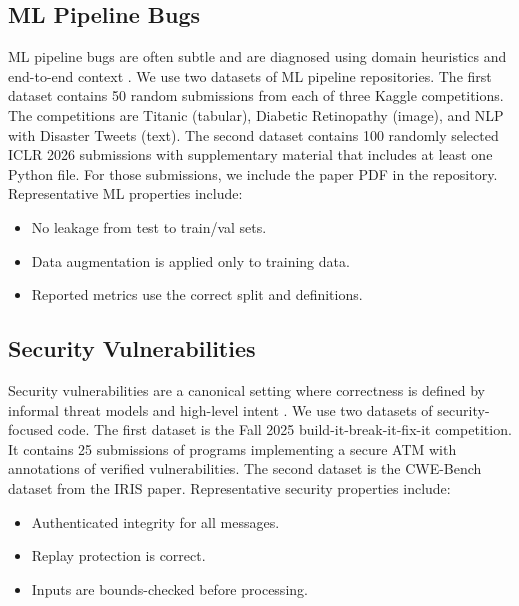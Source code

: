\documentclass{article}
\theoremstyle{plain}
\theoremstyle{definition}
\theoremstyle{remark}
\begin{document}
\subsection{ML Pipeline Bugs}
ML pipeline bugs are often subtle and are diagnosed using domain heuristics and end-to-end context \citep{schoop2021umlaut}.
We use two datasets of ML pipeline repositories.
The first dataset contains 50 random submissions from each of three Kaggle competitions.
The competitions are Titanic (tabular), Diabetic Retinopathy (image), and NLP with Disaster Tweets (text).
The second dataset contains 100 randomly selected ICLR 2026 submissions with supplementary material that includes at least one Python file.
For those submissions, we include the paper PDF in the repository.
Representative ML properties include:
\begin{itemize}
  \item No leakage from test to train/val sets.
  \item Data augmentation is applied only to training data.
  \item Reported metrics use the correct split and definitions.
\end{itemize}

\subsection{Security Vulnerabilities}
Security vulnerabilities are a canonical setting where correctness is defined by informal threat models and high-level intent \citep{ruef2016bibifi,li2024iris}.
We use two datasets of security-focused code.
The first dataset is the Fall 2025 build-it-break-it-fix-it competition.
It contains 25 submissions of programs implementing a secure ATM with annotations of verified vulnerabilities.
The second dataset is the CWE-Bench dataset from the IRIS paper.
Representative security properties include:
\begin{itemize}
  \item Authenticated integrity for all messages.
  \item Replay protection is correct.
  \item Inputs are bounds-checked before processing.
\end{itemize}
\end{document}

